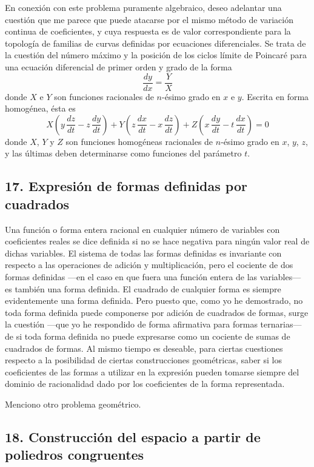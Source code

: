 \documentclass[a4paper, 12pt]{article}
\begin{document}
En conexión con este problema puramente algebraico, deseo adelantar una cuestión que me parece que puede atacarse por el mismo método de variación continua de coeficientes, y cuya respuesta es de valor correspondiente para la topología de familias de curvas definidas por ecuaciones diferenciales. Se trata de la cuestión del número máximo y la posición de los ciclos límite de Poincaré para una ecuación diferencial de primer orden y grado de la forma
$$
\frac{dy}{dx}=\frac{Y}{X}
$$
donde $X$ e $Y$ son funciones racionales de $n$-ésimo grado en $x$ e $y$. Escrita
en forma homogénea, ésta es
$$
X \left(y\,\frac{dz}{dt}-z\,\frac{dy}{dt}\right)+ Y\left(z\, \frac{dx}{dt}-x\,\frac{dz}{dt} \right)+ Z \left(x\, \frac{dy}{dt}-t\, \frac{dx}{dt} \right)=0
$$
donde $X$, $Y$ y $Z$ son funciones homogéneas racionales de $n$-ésimo grado en $x$, $y$, $z$, y las últimas deben determinarse como funciones del parámetro $t$.


\subsection*{17. Expresión de formas definidas por cuadrados}



Una función o forma entera racional en cualquier número de variables con coeficientes reales se dice definida si no se hace negativa para ningún valor real de dichas variables. El sistema de todas las formas definidas es invariante con respecto a las operaciones de adición y multiplicación, pero el cociente de dos formas definidas ---en el caso en que fuera una función entera de las variables--- es también una forma definida. El cuadrado de cualquier forma es siempre evidentemente una forma definida. Pero puesto que, como yo he demostrado, no toda forma definida puede componerse por adición de cuadrados de formas, surge la cuestión ---que yo he respondido de forma afirmativa para formas ternarias---  de si toda forma definida no puede expresarse como un cociente de sumas de cuadrados de formas. Al mismo tiempo es deseable, para ciertas cuestiones respecto a la posibilidad de ciertas construcciones geométricas, saber si los coeficientes de las formas a utilizar en la expresión pueden tomarse siempre del dominio de racionalidad dado por los coeficientes de la forma representada.

Menciono otro problema geométrico.

\subsection*{18. Construcción del espacio a partir de poliedros congruentes}
\end{document}
